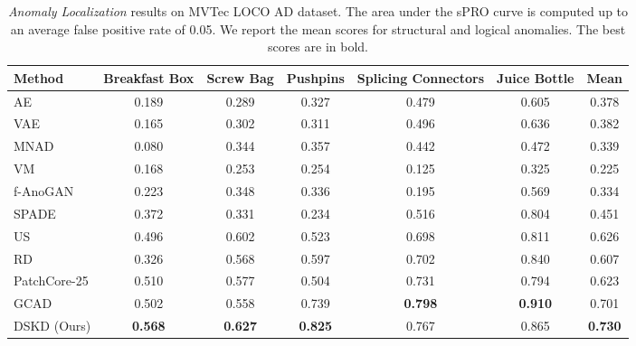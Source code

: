 \documentclass[10pt,twocolumn,letterpaper]{article}
\begin{document}
\begin{table*}[t]
\caption{\textit{Anomaly Localization} results on MVTec LOCO AD dataset\cite{bergmann2022beyond}. The area under the sPRO curve is computed up to an average false positive rate of 0.05. We report the mean scores for structural and logical anomalies. The best scores are in bold.}
\centering
\begin{tabular}{lcccccc}
\hline
Method      & Breakfast Box  & Screw Bag      & Pushpins       & Splicing Connectors & Juice Bottle   & Mean           \\ \hline
AE          & 0.189          & 0.289          & 0.327          & 0.479               & 0.605          & 0.378          \\
VAE         & 0.165          & 0.302          & 0.311          & 0.496               & 0.636          & 0.382          \\
MNAD \cite{park2020learning}       & 0.080          & 0.344          & 0.357          & 0.442               & 0.472          & 0.339          \\
VM          & 0.168          & 0.253          & 0.254          & 0.125               & 0.325          & 0.225          \\
f-AnoGAN \cite{schlegl2019f}    & 0.223          & 0.348          & 0.336          & 0.195               & 0.569          & 0.334          \\
SPADE \cite{cohen2020sub}      & 0.372          & 0.331          & 0.234          & 0.516               & 0.804          & 0.451          \\
US \cite{bergmann2020uninformed}         & 0.496          & 0.602          & 0.523          & 0.698               & 0.811          & 0.626          \\
RD \cite{deng2022anomaly}         & 0.326          & 0.568          & 0.597          & 0.702               & 0.840          & 0.607          \\
PatchCore-25 \cite{roth2022towards} & 0.510 & 0.577 & 0.504 & 0.731 &0.794 & 0.623 \\
GCAD \cite{bergmann2022beyond}       & 0.502          & 0.558          & 0.739          & \textbf{0.798}      & \textbf{0.910} & 0.701          \\
DSKD (Ours) & \textbf{0.568} & \textbf{0.627} & \textbf{0.825} & 0.767               & 0.865          & \textbf{0.730} \\ \hline
\end{tabular}
\label{tab_al}
\end{table*}
\end{document}
